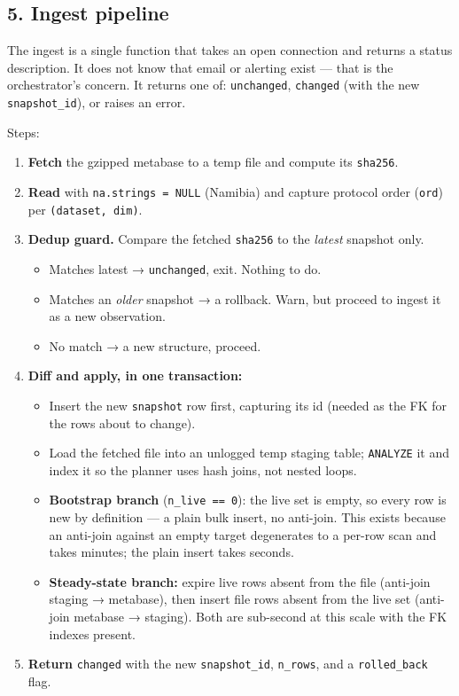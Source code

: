 \documentclass[
]{article}
\providecommand{\tightlist}{%
  \setlength{\itemsep}{0pt}\setlength{\parskip}{0pt}}
\begin{document}
\subsection{5. Ingest pipeline}\label{ingest-pipeline}

The ingest is a single function that takes an open connection and
returns a status description. It does not know that email or alerting
exist --- that is the orchestrator's concern. It returns one of:
\texttt{unchanged}, \texttt{changed} (with the new
\texttt{snapshot\_id}), or raises an error.

Steps:

\begin{enumerate}
\def\labelenumi{\arabic{enumi}.}
\tightlist
\item
  \textbf{Fetch} the gzipped metabase to a temp file and compute its
  \texttt{sha256}.
\item
  \textbf{Read} with \texttt{na.strings\ =\ NULL} (Namibia) and capture
  protocol order (\texttt{ord}) per \texttt{(dataset,\ dim)}.
\item
  \textbf{Dedup guard.} Compare the fetched \texttt{sha256} to the
  \emph{latest} snapshot only.

  \begin{itemize}
  \tightlist
  \item
    Matches latest → \texttt{unchanged}, exit. Nothing to do.
  \item
    Matches an \emph{older} snapshot → a rollback. Warn, but proceed to
    ingest it as a new observation.
  \item
    No match → a new structure, proceed.
  \end{itemize}
\item
  \textbf{Diff and apply, in one transaction:}

  \begin{itemize}
  \tightlist
  \item
    Insert the new \texttt{snapshot} row first, capturing its id (needed
    as the FK for the rows about to change).
  \item
    Load the fetched file into an unlogged temp staging table;
    \texttt{ANALYZE} it and index it so the planner uses hash joins, not
    nested loops.
  \item
    \textbf{Bootstrap branch} (\texttt{n\_live\ ==\ 0}): the live set is
    empty, so every row is new by definition --- a plain bulk insert, no
    anti-join. This exists because an anti-join against an empty target
    degenerates to a per-row scan and takes minutes; the plain insert
    takes seconds.
  \item
    \textbf{Steady-state branch:} expire live rows absent from the file
    (anti-join staging → metabase), then insert file rows absent from
    the live set (anti-join metabase → staging). Both are sub-second at
    this scale with the FK indexes present.
  \end{itemize}
\item
  \textbf{Return} \texttt{changed} with the new \texttt{snapshot\_id},
  \texttt{n\_rows}, and a \texttt{rolled\_back} flag.
\end{enumerate}
\end{document}
